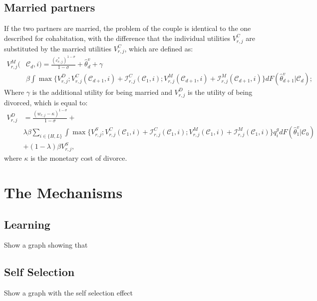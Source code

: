 \documentclass[12pt]{article}
\begin{document}
 \subsection{Married partners}
If the two partners are married, the problem of the couple is identical to the one described for cohabitation, with the difference that the individual utilities $V_{r,j}^{C}$ are substituted by the married utilities $V_{r,j}^{C}$, which are defined as:
\begin{equation}\label{eq:vceo}
\begin{split}
V_{r,j}^{M}(&\mathcal{C}_d,i)=\frac{(c_{r,j}^*)^{1-\sigma}}{1-\sigma}+\hat{\theta}_{d}^v+\gamma\\& \beta\int\max\bigg\{V_{r,j}^D;V^{C}_{r,j}(\mathcal{C}_{d+1},i)+\mathcal{I}_{r,j}^C(\mathcal{C}_1,i);V^{M}_{r,j}(\mathcal{C}_{d+1},i)+\mathcal{I}_{r,j}^M(\mathcal{C}_{d+1},i)\bigg\} dF(\hat{\theta}_{d+1}^v|\mathcal{C}_{d});
\end{split}
\end{equation}
Where $\gamma$ is the additional utility for being married and $V_{r,j}^D$ is the utility of being divorced, which is equal to:
\begin{equation}\label{eq:dsi}
\begin{split}
V_{r,j}^D&=\frac{(w_{r,j}-\kappa)^{1-\sigma}}{1-\sigma}+\\&\lambda\beta\sum_{i\in \{H,L\}}\int\max\bigg\{V_{r,j}^S;V^{C}_{r,j}(\mathcal{C}_1,i)+\mathcal{I}_{r,j}^C(\mathcal{C}_1,i);V^{M}_{r,j}(\mathcal{C}_1,i)+\mathcal{I}_{r,j}^M(\mathcal{C}_1,i)\bigg\}q^{g}_i dF(\hat{\theta}_1^v|\mathcal{C}_0)\\&
+(1-\lambda)\beta V_{r,j}^S,
\end{split}
\end{equation}
where $\kappa$ is the monetary cost of divorce.

\section{The Mechanisms}
\subsection{Learning}
Show a graph showing that
\subsection{Self Selection}
Show a graph with the self selection effect
\end{document}
